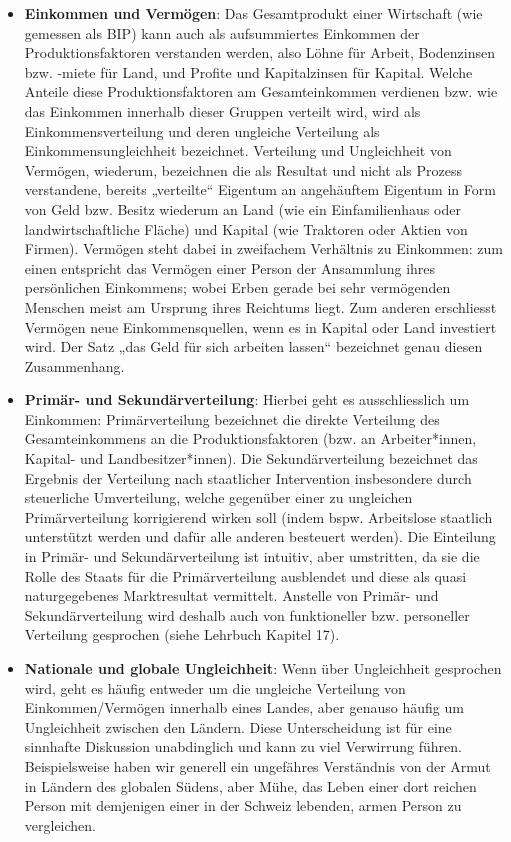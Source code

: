 \documentclass[
  nswissgerman,
  a4paper,
  DIV=11,
  numbers=noendperiod,
  oneside,
  openany]{scrreprt}
\begin{document}
\begin{itemize}
\item
  \textbf{Einkommen und Vermögen}: Das Gesamtprodukt einer Wirtschaft
  (wie gemessen als BIP) kann auch als aufsummiertes Einkommen der
  Produktionsfaktoren verstanden werden, also Löhne für Arbeit,
  Bodenzinsen bzw. -miete für Land, und Profite und Kapitalzinsen für
  Kapital. Welche Anteile diese Produktionsfaktoren am Gesamteinkommen
  verdienen bzw. wie das Einkommen innerhalb dieser Gruppen verteilt
  wird, wird als Einkommensverteilung und deren ungleiche Verteilung als
  Einkommensungleichheit bezeichnet. Verteilung und Ungleichheit von
  Vermögen, wiederum, bezeichnen die als Resultat und nicht als Prozess
  verstandene, bereits „verteilte`` Eigentum an angehäuftem Eigentum in
  Form von Geld bzw. Besitz wiederum an Land (wie ein Einfamilienhaus
  oder landwirtschaftliche Fläche) und Kapital (wie Traktoren oder
  Aktien von Firmen). Vermögen steht dabei in zweifachem Verhältnis zu
  Einkommen: zum einen entspricht das Vermögen einer Person der
  Ansammlung ihres persönlichen Einkommens; wobei Erben gerade bei sehr
  vermögenden Menschen meist am Ursprung ihres Reichtums liegt. Zum
  anderen erschliesst Vermögen neue Einkommensquellen, wenn es in
  Kapital oder Land investiert wird. Der Satz „das Geld für sich
  arbeiten lassen`` bezeichnet genau diesen Zusammenhang.
\item
  \textbf{Primär- und Sekundärverteilung}: Hierbei geht es
  ausschliesslich um Einkommen: Primärverteilung bezeichnet die direkte
  Verteilung des Gesamteinkommens an die Produktionsfaktoren (bzw. an
  Arbeiter*innen, Kapital- und Landbesitzer*innen). Die
  Sekundärverteilung bezeichnet das Ergebnis der Verteilung nach
  staatlicher Intervention insbesondere durch steuerliche Umverteilung,
  welche gegenüber einer zu ungleichen Primärverteilung korrigierend
  wirken soll (indem bspw. Arbeitslose staatlich unterstützt werden und
  dafür alle anderen besteuert werden). Die Einteilung in Primär- und
  Sekundärverteilung ist intuitiv, aber umstritten, da sie die Rolle des
  Staats für die Primärverteilung ausblendet und diese als quasi
  naturgegebenes Marktresultat vermittelt. Anstelle von Primär- und
  Sekundärverteilung wird deshalb auch von funktioneller bzw.
  personeller Verteilung gesprochen (siehe Lehrbuch Kapitel 17).
\item
  \textbf{Nationale und globale Ungleichheit}: Wenn über Ungleichheit
  gesprochen wird, geht es häufig entweder um die ungleiche Verteilung
  von Einkommen/Vermögen innerhalb eines Landes, aber genauso häufig um
  Ungleichheit zwischen den Ländern. Diese Unterscheidung ist für eine
  sinnhafte Diskussion unabdinglich und kann zu viel Verwirrung führen.
  Beispielsweise haben wir generell ein ungefähres Verständnis von der
  Armut in Ländern des globalen Südens, aber Mühe, das Leben einer dort
  reichen Person mit demjenigen einer in der Schweiz lebenden, armen
  Person zu vergleichen.
\end{itemize}
\end{document}
